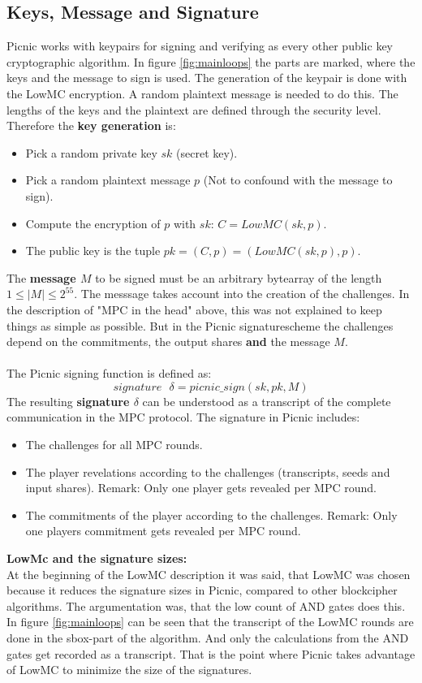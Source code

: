 \documentclass[]{article}
\begin{document}
\subsection{Keys, Message and Signature}
Picnic works with keypairs for signing and verifying as every other public key cryptographic algorithm. In figure \ref{fig:mainloops} the parts are marked, where the keys and the message to sign is used. The generation of the keypair is done with the LowMC encryption. A random plaintext message is needed to do this. The lengths of the keys and the plaintext are defined through the security level. Therefore the \textbf{key generation} is:
\begin{itemize}
\item{Pick a random private key $sk$ (secret key).}
\item{Pick a random plaintext message $p$ (Not to confound with the message to sign).}
\item{Compute the encryption of $p$ with $sk$: $C = LowMC(sk, p)$.}
\item{The public key is the tuple $pk = (C,p) = (LowMC(sk,p), p)$.}
\end{itemize}
The \textbf{message $M$} to be signed must be an arbitrary bytearray of the length $1 \leq \vert M  \vert \leq 2^{55}$. The messsage takes account into the creation of the challenges. In the description of "MPC in the head" above, this was not explained to keep things as simple as possible. But in the Picnic signaturescheme the challenges depend on the commitments, the output shares \textbf{and} the message $M$.\\ \\
The Picnic signing function is defined as:
\[signature\text{ }\delta = picnic\_sign(sk, pk, M)\]
The resulting \textbf{signature $\delta$} can be understood as a transcript of the complete communication in the MPC protocol. The signature in Picnic includes:
\begin{itemize}
\item{The challenges for all MPC rounds.}
\item{The player revelations according to the challenges (transcripts, seeds and input shares). Remark: Only one player gets revealed per MPC round.}
\item{The commitments of the player according to the challenges. Remark: Only one players commitment gets revealed per MPC round.}
\end{itemize}
\textbf{LowMc and the signature sizes:}\\
At the beginning of the LowMC description it was said, that LowMC was chosen because it reduces the signature sizes in Picnic, compared to other blockcipher algorithms. The argumentation was, that the low count of AND gates does this. In figure \ref{fig:mainloops} can be seen that the transcript of the LowMC rounds are done in the sbox-part of the algorithm. And only the calculations from the AND gates get recorded as a transcript. That is the point where Picnic takes advantage of LowMC to minimize the size of the signatures.
\end{document}
